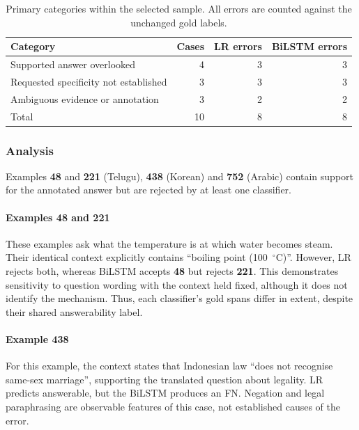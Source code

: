 \documentclass[11pt]{article}
\begin{document}
\begin{table}[!h]
    \centering
    \small
    \begin{tabular}{lrrr}
        \toprule
        Category & Cases & LR errors & BiLSTM errors \\
        \midrule
        Supported answer overlooked & 4 & 3 & 3 \\
        Requested specificity not established & 3 & 3 & 3 \\
        Ambiguous evidence or annotation & 3 & 2 & 2 \\
        \midrule
        Total & 10 & 8 & 8 \\
        \bottomrule
    \end{tabular}
    \caption{Primary categories within the selected sample. All errors are counted against the unchanged gold labels.}
    \label{table:week_39_error_categories}
\end{table}

\subsubsection*{Analysis}

Examples \textbf{48} and \textbf{221} (Telugu), \textbf{438} (Korean) and \textbf{752} (Arabic) contain support for the annotated answer but are rejected by at least one classifier.

\paragraph{Examples 48 and 221} These examples ask what the temperature is at which water becomes steam. Their identical context explicitly contains ``boiling point (100~$^\circ$C)''. However, LR rejects both, whereas BiLSTM accepts \textbf{48} but rejects \textbf{221}. This demonstrates sensitivity to question wording with the context held fixed, although it does not identify the mechanism. Thus, each classifier's gold spans differ in extent, despite their shared answerability label.

\paragraph{Example 438} 
For this example, the context states that Indonesian law ``does not recognise same-sex marriage'', supporting the translated question about legality. LR predicts answerable, but the BiLSTM produces an FN. Negation and legal paraphrasing are observable features of this case, not established causes of the error.
\end{document}

